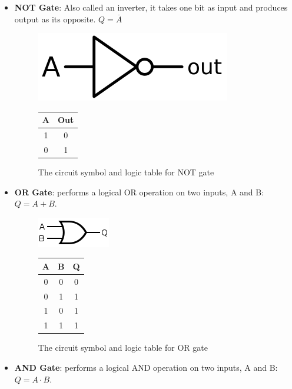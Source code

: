\begin{itemize}
    \item \textbf{NOT Gate}: Also called an inverter, it takes one bit as input and produces output as its opposite. $Q=\overline{A}$
    
    \begin{figure}[!ht]
        \centering
        \includegraphics[width=0.30\columnwidth]{images/not.png}
        \qquad
        \begin{tabular}[b]{|c|c|}\hline
          A & Out \\ \hline
          1 & 0 \\
          0 & 1 \\ \hline
        \end{tabular}
        \caption{The circuit symbol and logic table for NOT gate}
    \end{figure}


    \item \textbf{OR Gate}: performs a logical OR operation on two inputs, A and B: $Q=A+B$.
    
    \begin{figure}[!ht]
        \centering
        \includegraphics[width=0.30\columnwidth]{images/or.png}
        \qquad
        \begin{tabular}[b]{|c|c|c|}\hline
          A & B & Q \\ \hline
          0 & 0 & 0 \\ 
          0 & 1 & 1 \\
          1 & 0 & 1 \\
          1 & 1 & 1 \\ \hline
        \end{tabular}
        \caption{The circuit symbol and logic table for OR gate}
    \end{figure}


    \item \textbf{AND Gate}: performs a logical AND operation on two inputs, A and B: $Q=A\cdot B$.
    

\end{itemize}
